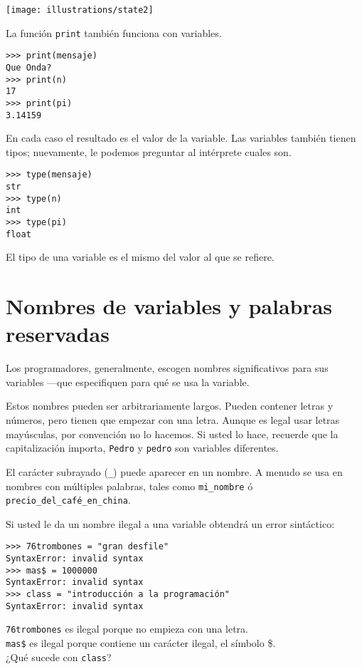 \beforefig \centerline{\texttt{[image: illustrations/state2]}}
\afterfig

La función \texttt{print} también funciona con variables.

\begin{lstlisting}
>>> print(mensaje)
Que Onda?
>>> print(n)
17
>>> print(pi)
3.14159
\end{lstlisting}
 

En cada caso el resultado es el valor de la variable. Las variables
también tienen tipos; nuevamente, le podemos preguntar al intérprete
cuales son.

\begin{lstlisting}
>>> type(mensaje)
str
>>> type(n)
int
>>> type(pi)
float
\end{lstlisting}
 

El tipo de una variable es el mismo del valor al que se refiere.

\section{Nombres de variables y palabras reservadas}

 

Los programadores, generalmente, escogen nombres significativos para
sus variables —que especifiquen para qué se usa la variable.

Estos nombres pueden ser arbitrariamente largos. Pueden contener letras
y números, pero tienen que empezar con una letra. Aunque es legal
usar letras mayúsculas, por convención no lo hacemos. Si usted lo
hace, recuerde que la capitalización importa, \texttt{Pedro} y \texttt{pedro}
son variables diferentes.

El carácter subrayado (\texttt{\_}) puede aparecer en un nombre. A
menudo se usa en nombres con múltiples palabras, tales como \texttt{mi\_nombre}
ó \texttt{precio\_del\_café\_en\_china}.


Si usted le da un nombre ilegal a una variable obtendrá un error sintáctico:

\begin{lstlisting}
>>> 76trombones = "gran desfile"
SyntaxError: invalid syntax
>>> mas$ = 1000000
SyntaxError: invalid syntax
>>> class = "introducción a la programación"
SyntaxError: invalid syntax
\end{lstlisting}

\texttt{76trombones} es ilegal porque no empieza con una letra.\\
\texttt{mas\$} es ilegal porque contiene un carácter ilegal, el símbolo
\$.\\
¿Qué sucede con \texttt{class}?

